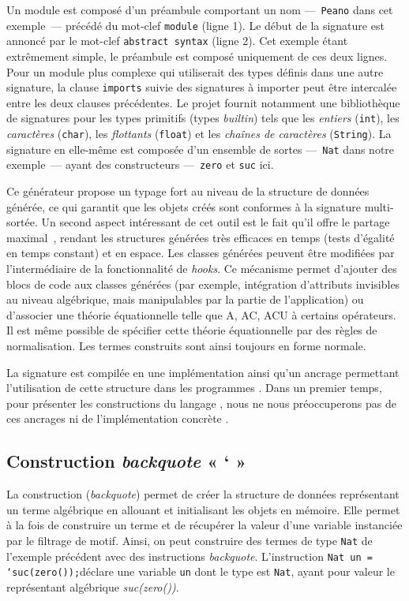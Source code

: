Un module {\gom} est composé d'un préambule comportant un nom
---~\texttt{Peano} dans cet exemple~--- précédé du mot-clef \texttt{module}
(ligne 1). Le début de la signature est annoncé par le mot-clef
\texttt{abstract syntax} (ligne 2). Cet exemple étant extrêmement simple, le
préambule est composé uniquement de ces deux lignes. Pour un module plus
complexe qui utiliserait des types définis dans une autre signature, la clause
\texttt{imports} suivie des signatures à importer peut être intercalée entre
les deux clauses précédentes. Le projet {\tom} fournit notamment une
bibliothèque de signatures pour les types primitifs (types \emph{builtin}) tels
que les \emph{entiers} (\texttt{int}), les \emph{caractères} (\texttt{char}),
les \emph{flottants} (\texttt{float}) et les \emph{chaînes de caractères}
(\texttt{String}). La signature en elle-même est composée d'un ensemble de
sortes ---~\texttt{Nat} dans notre exemple~--- ayant des constructeurs
---~\texttt{zero} et \texttt{suc} ici.

Ce générateur propose un typage fort au niveau de la structure de données
{\java} générée, ce qui garantit que les objets créés sont conformes à la
signature multi-sortée. Un second aspect intéressant de cet outil est le fait
qu'il offre le partage maximal~\cite{Appel1993}, rendant les structures
générées très efficaces en temps (tests d'égalité en temps constant) et en
espace. Les classes générées peuvent être modifiées par l'intermédiaire de la
fonctionnalité de \emph{hooks}. Ce mécanisme permet d'ajouter des blocs de code
{\java} aux classes générées (par exemple, intégration d'attributs invisibles
au niveau algébrique, mais manipulables par la partie {\java} de l'application)
ou d'associer une théorie équationnelle telle que A, AC, ACU à certains
opérateurs. Il est même possible de spécifier cette théorie équationnelle par
des règles de normalisation. Les termes construits sont ainsi toujours en forme
normale.

La signature est compilée en une implémentation {\java} ainsi qu'un ancrage
permettant l'utilisation de cette structure dans les programmes {\tom}. Dans un
premier temps, pour présenter les constructions du langage {\tom}, nous ne nous
préoccuperons pas de ces ancrages ni de l'implémentation concrète {\java}.

\subsection{Construction \emph{backquote} « ` »}
La construction  (\emph{backquote}) permet de créer la structure de
données représentant un terme algébrique en allouant et initialisant les objets
en mémoire. Elle permet à la fois de construire un terme et de récupérer la
valeur d'une variable instanciée par le filtrage de motif.  Ainsi, on peut
construire des termes de type \texttt{Nat} de l'exemple précédent avec des
instructions \emph{backquote}. L'instruction {\tomjava} \og\texttt{Nat un =
`suc(zero());}\fg déclare une variable \texttt{un} dont le type est \texttt{Nat},
ayant pour valeur le représentant algébrique \emph{suc(zero())}.

